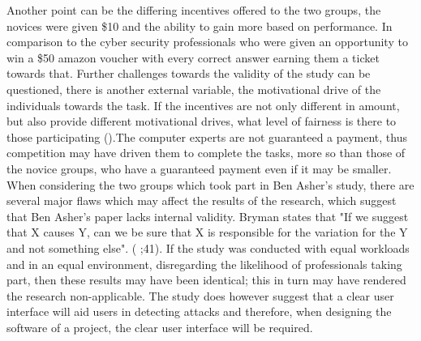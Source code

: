 Another point can be the differing incentives offered to the two groups, the novices were given \$10 and the ability to gain more based on performance. In comparison to the cyber security professionals who were given an opportunity to win a \$50 amazon voucher with every correct answer earning them a ticket towards that. Further challenges towards the validity of the study can be questioned, there is another external variable, the motivational drive of the individuals towards the task. If the incentives are not only different in amount, but also provide different motivational drives, what level of fairness is there to those participating (\cite{Incentives}).The computer experts are not guaranteed a payment, thus competition may have driven them to complete the tasks, more so than those of the novice groups, who have a guaranteed payment even if it may be smaller. 
When considering the two groups which took part in Ben Asher's study, there are several major flaws which may affect the results of the research, which suggest that Ben Asher's paper lacks internal validity. Bryman states that "If we suggest that X causes Y, can we be sure that X is responsible for the variation for the Y and not something else". (\citeauthor{bryman_2016} \citeyear{bryman_2016};41). If the study was conducted with equal workloads and in an equal environment, disregarding the likelihood of professionals taking part, then these results may have been identical; this in turn may have rendered the research non-applicable. The study does however suggest that a clear user interface will aid users in detecting attacks and therefore, when designing the software of a project, the clear user interface will be required.



